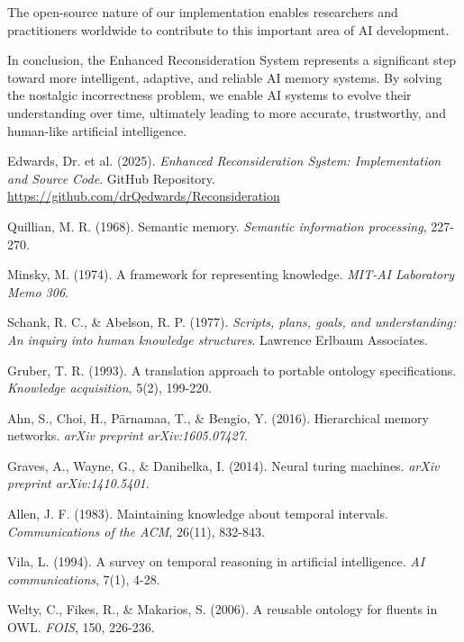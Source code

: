 \documentclass[12pt,a4paper]{article}
\begin{document}
The open-source nature of our implementation \cite{edwards2025reconsideration} enables researchers and practitioners worldwide to contribute to this important area of AI development.

In conclusion, the Enhanced Reconsideration System represents a significant step toward more intelligent, adaptive, and reliable AI memory systems. By solving the nostalgic incorrectness problem, we enable AI systems to evolve their understanding over time, ultimately leading to more accurate, trustworthy, and human-like artificial intelligence.




\begin{thebibliography}{50}

Edwards, Dr. et al. (2025).
\textit{Enhanced Reconsideration System: Implementation and Source Code}.
GitHub Repository.
\url{https://github.com/drQedwards/Reconsideration}

Quillian, M. R. (1968).
Semantic memory.
\textit{Semantic information processing}, 227-270.

Minsky, M. (1974).
A framework for representing knowledge.
\textit{MIT-AI Laboratory Memo 306}.

Schank, R. C., \& Abelson, R. P. (1977).
\textit{Scripts, plans, goals, and understanding: An inquiry into human knowledge structures}.
Lawrence Erlbaum Associates.

Gruber, T. R. (1993).
A translation approach to portable ontology specifications.
\textit{Knowledge acquisition}, 5(2), 199-220.

Ahn, S., Choi, H., Pärnamaa, T., \& Bengio, Y. (2016).
Hierarchical memory networks.
\textit{arXiv preprint arXiv:1605.07427}.

Graves, A., Wayne, G., \& Danihelka, I. (2014).
Neural turing machines.
\textit{arXiv preprint arXiv:1410.5401}.

Allen, J. F. (1983).
Maintaining knowledge about temporal intervals.
\textit{Communications of the ACM}, 26(11), 832-843.

Vila, L. (1994).
A survey on temporal reasoning in artificial intelligence.
\textit{AI communications}, 7(1), 4-28.

Welty, C., Fikes, R., \& Makarios, S. (2006).
A reusable ontology for fluents in OWL.
\textit{FOIS}, 150, 226-236.


\end{thebibliography}
\end{document}
